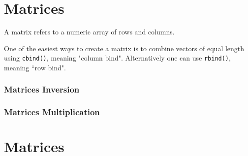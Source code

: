 \documentclass[a4paper,12pt]{article}
\begin{document}
\section{Matrices}
A matrix refers to a numeric array of rows and columns.

One of the easiest ways to create a matrix is to combine vectors of equal
length using \texttt{cbind()}, meaning "column bind". Alternatively one can use  \texttt{rbind()}, meaning ``row bind".


\subsubsection{Matrices Inversion}
\subsubsection{Matrices Multiplication}


\section{Matrices}
\end{document}
